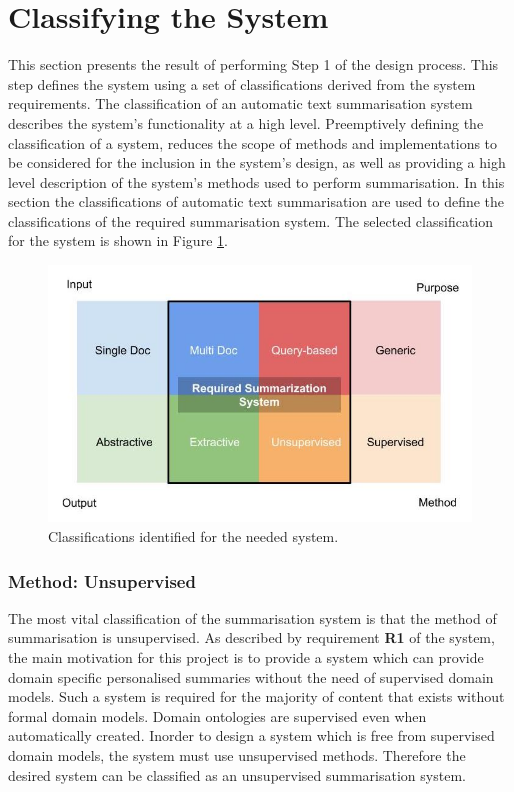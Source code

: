 \section{Classifying the System}
\label{sec:3.2}
This section presents the result of performing Step 1 of the design process. This step defines the system using a set of classifications derived from the system requirements. The classification of an automatic text summarisation system describes the system’s functionality at a high level. Preemptively defining the classification of a system, reduces the scope of methods and implementations to be considered for the inclusion in the system’s design, as well as providing a high level description of the system’s methods used to perform summarisation. In this section the classifications of automatic text summarisation are used to define the classifications of the required summarisation system. The selected classification for the system is shown in Figure \ref{fig:classification}. 

\begin{figure}[h]
    \centering
         \includegraphics[width=.70\textwidth]{Figures/System_Classification.jpg}
          \caption{Classifications identified for the needed system.}
           \label{fig:classification}
\end{figure}

\subsubsection{Method: Unsupervised}
The most vital classification of the summarisation system is that the method of summarisation is unsupervised. As described by requirement \textbf{R1} of the system, the main motivation for this project is to provide a system which can provide domain specific personalised summaries without the need of supervised domain models. Such a system is required for the majority of content that exists without formal domain models. Domain ontologies are supervised even when automatically created. Inorder to design a system which is free from supervised domain models, the system must use unsupervised methods. Therefore the desired system can be classified as an unsupervised summarisation system.

